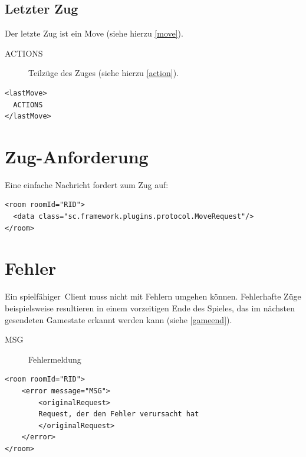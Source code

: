 \documentclass[12pt,a4paper, ngerman, oneside]{scrartcl}
\begin{document}
\subsection{\label{lastmove}Letzter Zug}
Der letzte Zug ist ein Move (siehe hierzu \ref{move}).
\begin{description}
\item[ACTIONS] Teilzüge des Zuges (siehe hierzu \ref{action}).
\end{description}
\begin{verbatim}
<lastMove>
  ACTIONS
</lastMove>
\end{verbatim}

\section{\label{moverequest}Zug-Anforderung}
Eine einfache Nachricht fordert zum Zug auf:
\begin{verbatim}
<room roomId="RID">
  <data class="sc.framework.plugins.protocol.MoveRequest"/>
</room>
\end{verbatim}

\section{Fehler}
Ein \glqq spielfähiger\grqq\ Client muss nicht mit Fehlern umgehen können.
Fehlerhafte Züge beispielsweise resultieren in einem vorzeitigen Ende des
Spieles, das im nächsten gesendeten Gamestate erkannt werden kann (siehe \ref{gameend}).
\begin{description}
\item[MSG] Fehlermeldung
\end{description}
\begin{verbatim}
<room roomId="RID">
	<error message="MSG">
		<originalRequest>
		Request, der den Fehler verursacht hat
		</originalRequest>
	</error>
</room>
\end{verbatim}
\end{document}
